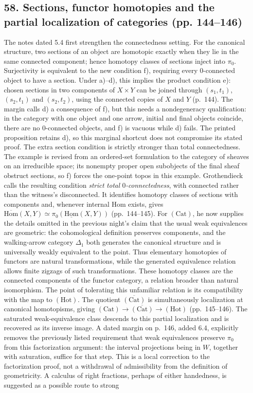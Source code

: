 \subsection*{58. Sections, functor homotopies and the partial localization of categories (pp. 144--146)}
The notes dated 5.4 first strengthen the connectedness setting. For the canonical structure, two sections of an object are homotopic exactly when they lie in the same connected component; hence homotopy classes of sections inject into $\pi_0$. Surjectivity is equivalent to the new condition f), requiring every $0$-connected object to have a section. Under a)--d), this implies the product condition e): chosen sections in two components of $X\times Y$ can be joined through $(s_1,t_1)$, $(s_2,t_1)$ and $(s_2,t_2)$, using the connected copies of $X$ and $Y$ (p.~144). The margin calls d) a consequence of f), but this needs a nondegeneracy qualification: in the category with one object and one arrow, initial and final objects coincide, there are no $0$-connected objects, and f) is vacuous while d) fails. The printed proposition retains d), so this marginal shortcut does not compromise its stated proof. The extra section condition is strictly stronger than total connectedness. The example is revised from an ordered-set formulation to the category of sheaves on an irreducible space; its nonempty proper open subobjects of the final sheaf obstruct sections, so f) forces the one-point topos in this example. Grothendieck calls the resulting condition \emph{strict total $0$-connectedness}, with connected rather than the witness's disconnected. It identifies homotopy classes of sections with components and, whenever internal Hom exists, gives $\overline{\mathrm{Hom}}(X,Y)\simeq\pi_0(\underline{\mathrm{Hom}}(X,Y))$ (pp.~144--145). For $(\mathrm{Cat})$, he now supplies the details omitted in the previous night's claim that the usual weak equivalences are geometric: the cohomological definition preserves components, and the walking-arrow category $\Delta_1$ both generates the canonical structure and is universally weakly equivalent to the point. Thus elementary homotopies of functors are natural transformations, while the generated equivalence relation allows finite zigzags of such transformations. These homotopy classes are the connected components of the functor category, a relation broader than natural isomorphism. The point of tolerating this unfamiliar relation is its compatibility with the map to $(\mathrm{Hot})$. The quotient $\overline{(\mathrm{Cat})}$ is simultaneously localization at canonical homotopisms, giving $(\mathrm{Cat})\to\overline{(\mathrm{Cat})}\to(\mathrm{Hot})$ (pp.~145--146). The saturated weak-equivalence class descends to this partial localization and is recovered as its inverse image. A dated margin on p.~146, added 6.4, explicitly removes the previously listed requirement that weak equivalences preserve $\pi_0$ from this factorization argument: the interval projections being in $W$, together with saturation, suffice for that step. This is a local correction to the factorization proof, not a withdrawal of admissibility from the definition of geometricity. A calculus of right fractions, perhaps of either handedness, is suggested as a possible route to strong 